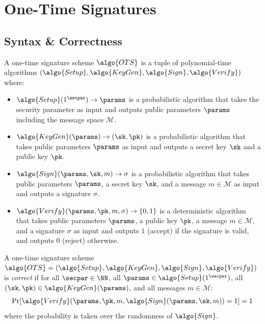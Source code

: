 \section{One-Time Signatures}\label{sec:one-time-sigs}

\subsection{Syntax \& Correctness}

\begin{definition}
    A one-time signature scheme $\algo{OTS}$ is a tuple of polynomial-time algorithms $(\algo{Setup}, \algo{KeyGen}, \algo{Sign}, \algo{Verify})$ where:
    \begin{itemize}
        \item $\algo{Setup}(1^\secpar) \rightarrow \params$ is a probabilistic algorithm that takes the security parameter as input and outputs public parameters $\params$ including the message space $\mathcal{M}$.
        \item $\algo{KeyGen}(\params) \rightarrow (\sk, \pk)$ is a probabilistic algorithm that takes public parameters $\params$ as input and outputs a secret key $\sk$ and a public key $\pk$.
        \item $\algo{Sign}(\params, \sk, m) \rightarrow \sigma$ is a probabilistic algorithm that takes public parameters $\params$, a secret key $\sk$, and a message $m \in \mathcal{M}$ as input and outputs a signature $\sigma$.
        \item $\algo{Verify}(\params, \pk, m, \sigma) \rightarrow \{0, 1\}$ is a deterministic algorithm that takes public parameters $\params$, a public key $\pk$, a message $m \in \mathcal{M}$, and a signature $\sigma$ as input and outputs $1$ (accept) if the signature is valid, and outputs $0$ (reject) otherwise.
    \end{itemize}
\end{definition}

\begin{definition}[Correctness]\label{def:ots-correctness}
  A one-time signature scheme $\algo{OTS} = (\algo{Setup}, \algo{KeyGen}, \algo{Sign}, \algo{Verify})$ is \emph{correct} if for all $\secpar \in \NN$, all $\params \in \algo{Setup}(1^\secpar)$, all $(\sk, \pk) \in \algo{KeyGen}(\params)$, and all messages $m \in \mathcal{M}$:
  \[
    \Pr[\algo{Verify}(\params, \pk, m, \algo{Sign}(\params, \sk, m)) = 1] = 1
  \]
  where the probability is taken over the randomness of $\algo{Sign}$.
\end{definition}

